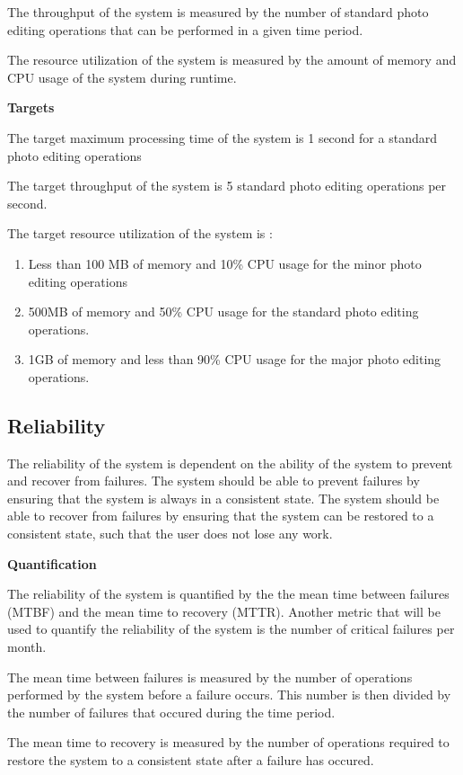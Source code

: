 \documentclass[11pt,a4paper]{article}
\begin{document}
The throughput of the system is measured by the number of standard photo editing operations that can be performed in a given time period.

The resource utilization of the system is measured by the amount of memory and CPU usage of the system during runtime.


    {\bf Targets}

The target maximum processing time of the system is 1 second for a standard photo editing operations

The target throughput of the system is 5 standard photo editing operations per second.

The target resource
utilization of the system is :
\begin{enumerate}
    \item Less than 100 MB of memory and 10\% CPU usage for the minor photo editing operations
    \item 500MB of memory and 50\% CPU usage for the standard photo editing operations.
    \item 1GB of memory and less than 90\% CPU usage for the major photo editing operations.
\end{enumerate}

\subsection*{Reliability}

The reliability of the system is dependent on the ability of the system to prevent and recover from failures.
The system should be able to prevent failures by ensuring that the system is always in a consistent state.
The system should be able to recover from failures by ensuring that the system can be restored to a consistent state, such that
the user does not lose any work.

    {\bf Quantification}

The reliability of the system is quantified by the the mean time between failures (MTBF) and the mean time to recovery (MTTR).
Another metric that will be used to quantify the reliability of the system is the number of critical failures per month.

The mean time between failures is measured by the number of operations performed by the system before a failure occurs. This number
is then divided by the number of failures that occured during the time period.


The mean time to recovery is measured by the number of operations required to restore the system to a consistent state after a failure has occured.
\end{document}
